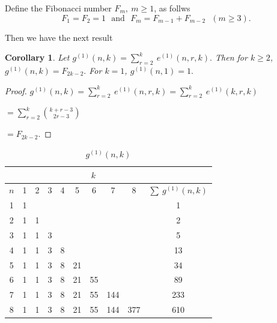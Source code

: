 \documentclass[10pt]{extarticle}
\numberwithin{equation}{section}
\numberwithin{bbb}{section}
\newtheorem{corollary}{Corollary}[section]
\numberwithin{equation}{section}
\begin{document}
\vspace{0.5cm}
Define the Fibonacci number $F_m, \ m \geq 1$, as follws
$$F_1=F_2=1 \ \ \ \text{and} \ \ \ F_m=F_{m-1}+F_{m-2} \ \ \ (m \geq 3).$$

\vspace{0.5cm}
Then we have the next result

\begin{corollary}
 Let $g^{(1)}(n,k)=\sum_{r=2}^{k} \ e^{(1)}(n,r,k).$ Then for $k \geq 2$, $g^{(1)}(n,k)=F_{2k-2}.$
 For $k=1$, $g^{(1)}(n,1)=1.$ 
\end{corollary}
\begin{proof}
   $g^{(1)}(n,k)=\sum_{r=2}^{k} \ e^{(1)}(n,r,k)= \sum_{r=2}^{k} \ e^{(1)}(k,r,k)$
   
    \vspace{0.5cm}
  \hspace{5.2cm}
  $=\sum_{r=2}^{k} \binom{k+r-3}{2r-3}$

  \vspace{0.5cm}
  \hspace{5.2cm}
 $=F_{2k-2}.$ 
\end{proof}

\vspace{1cm}
\begin{table}[h!]
    \centering
    \caption{$g^{(1)}(n,k)$}
    \renewcommand{\arraystretch}{1.2}
    \begin{tabular}{|c|c|c|c|c|c|c|c|c|c|}
    \hline
    & \multicolumn{8}{c}{$ \ \ \ \  \ \ \ \ \ \ \ \ \ k$} & \\
    \hline
    $n$ & 1 & 2 & 3 & 4 & 5 & 6 & 7 & 8 & $\sum \ g^{(1)}(n,k)$\\
    \hline
         1 & 1 & & & & & & & & 1 \\
         \hline
         2 & 1 & 1 & & & & & & & 2 \\
         \hline
         3 & 1 & 1 & 3 & & & & & & 5 \\
         \hline
         4 & 1 & 1 & 3 & 8 & & & & & 13 \\
         \hline
         5 & 1 & 1 & 3 & 8 & 21 & & & & 34 \\
         \hline
         6 & 1 & 1 & 3 & 8 & 21 & 55 & & & 89 \\
         \hline
         7 & 1 & 1 & 3 & 8 & 21 & 55 & 144 & & 233 \\
         \hline
         8 & 1 & 1 & 3 & 8 & 21 & 55 & 144 & 377 & 610 \\
         \hline
    \end{tabular}
    \label{tab:placeholder}
\end{table}
\end{document}
